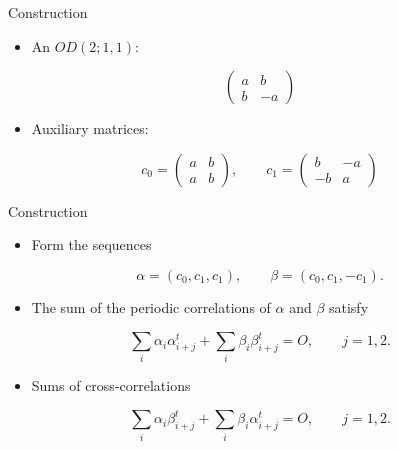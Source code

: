 \documentclass{beamer}
\begin{document}

\begin{frame}{Construction}

  \begin{itemize}
    \item An $OD(2;1,1)$:
  \end{itemize}

  \[
    \begin{pmatrix}
      a & b \\ b & -a
    \end{pmatrix}
  \]

  \begin{itemize}
    \item Auxiliary matrices:
  \end{itemize}

  \[
    c_0=
    \begin{pmatrix}
      a & b \\ a & b
    \end{pmatrix}, \qquad
    c_1=
    \begin{pmatrix}
      b & -a \\ -b & a
    \end{pmatrix}
  \]
 
\end{frame}

\begin{frame}{Construction}

  \begin{itemize}
    \item Form the sequences
  \end{itemize}

  $$
  \alpha = (c_0,c_1,c_1), \qquad \beta = (c_0,c_1,-c_1).
  $$

  \begin{itemize}
    \item The sum of the periodic correlations of $\alpha$ and $\beta$ satisfy
  \end{itemize}

  $$
  \sum_i \alpha_i\alpha_{i+j}^t + \sum_i \beta_i\beta_{i+j}^t = O, \qquad j=1,2.
  $$

  \begin{itemize}
    \item Sums of cross-correlations
  \end{itemize}

  $$
  \sum_i \alpha_i\beta_{i+j}^t + \sum_i \beta_i\alpha_{i+j}^t = O, \qquad j=1,2.
  $$

\end{frame}
\end{document}
